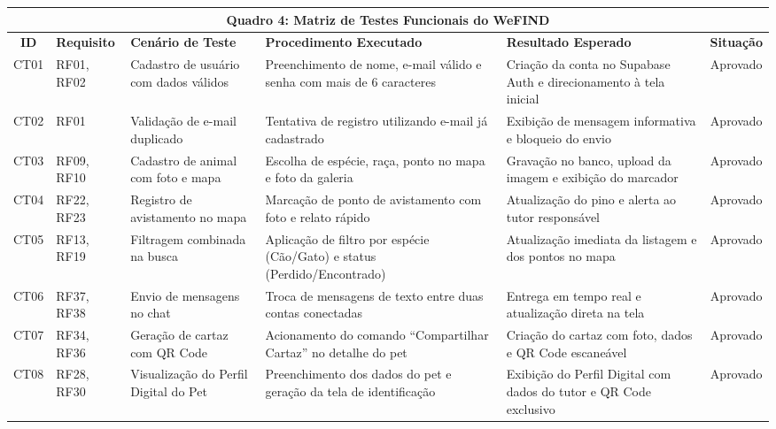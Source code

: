 \vspace{0.3cm}
\begin{table}[!htb]
\centering
{}\label{quadro:testes}
\small
\setlength{\tabcolsep}{3.5pt}
\renewcommand{\arraystretch}{1.2}
\begin{tabular}{|c|>{\centering\arraybackslash}p{1.8cm}|>{\raggedright\arraybackslash}p{2.6cm}|>{\raggedright\arraybackslash}p{3.8cm}|>{\raggedright\arraybackslash}p{3.6cm}|c|}
\hline
\multicolumn{6}{|c|}{\textbf{Quadro 4: Matriz de Testes Funcionais do WeFIND}} \\ \hline
\textbf{ID} & \textbf{Requisito} & \textbf{Cenário de Teste} & \textbf{Procedimento Executado} & \textbf{Resultado Esperado} & \textbf{Situação} \\ \hline
CT01 & RF01, RF02 & Cadastro de usuário com dados válidos & Preenchimento de nome, e-mail válido e senha com mais de 6 caracteres & Criação da conta no Supabase Auth e direcionamento à tela inicial & Aprovado \\ \hline
CT02 & RF01 & Validação de e-mail duplicado & Tentativa de registro utilizando e-mail já cadastrado & Exibição de mensagem informativa e bloqueio do envio & Aprovado \\ \hline
CT03 & RF09, RF10 & Cadastro de animal com foto e mapa & Escolha de espécie, raça, ponto no mapa e foto da galeria & Gravação no banco, upload da imagem e exibição do marcador & Aprovado \\ \hline
CT04 & RF22, RF23 & Registro de avistamento no mapa & Marcação de ponto de avistamento com foto e relato rápido & Atualização do pino e alerta ao tutor responsável & Aprovado \\ \hline
CT05 & RF13, RF19 & Filtragem combinada na busca & Aplicação de filtro por espécie (Cão/Gato) e status (Perdido/Encontrado) & Atualização imediata da listagem e dos pontos no mapa & Aprovado \\ \hline
CT06 & RF37, RF38 & Envio de mensagens no chat & Troca de mensagens de texto entre duas contas conectadas & Entrega em tempo real e atualização direta na tela & Aprovado \\ \hline
CT07 & RF34, RF36 & Geração de cartaz com QR Code & Acionamento do comando ``Compartilhar Cartaz'' no detalhe do pet & Criação do cartaz com foto, dados e QR Code escaneável & Aprovado \\ \hline
CT08 & RF28, RF30 & Visualização do Perfil Digital do Pet & Preenchimento dos dados do pet e geração da tela de identificação & Exibição do Perfil Digital com dados do tutor e QR Code exclusivo & Aprovado \\ \hline
\end{tabular}
\end{table}

